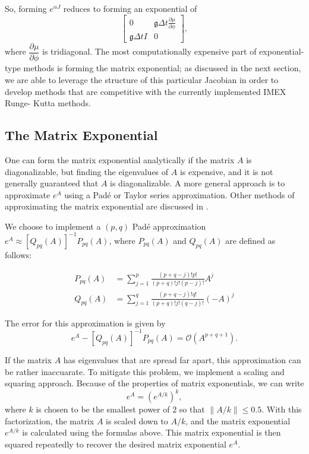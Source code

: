 \documentclass{csri19}
\newcommand{\CFKg}{\mathfrak{g}}
\begin{document}
So, forming $e^{\alpha J}$ reduces to forming an exponential of 
\[ \begin{bmatrix}
   0              & \CFKg \Delta t \frac{\partial \mu}{\partial \phi} \\
 \CFKg \Delta t I & 0  \end{bmatrix},\]
where $\dfrac{\partial \mu}{\partial \phi}$ is tridiagonal. The most 
computationally expensive part of exponential-type methods is forming the 
matrix exponential; as discussed in the next section, we are able to 
leverage the structure of this particular Jacobian in order to develop 
methods that are competitive with the currently implemented IMEX Runge-
Kutta methods.

\subsection{The Matrix Exponential}\label{CFK:sec:matexp} 
One can form the matrix exponential analytically if the matrix $A$ is 
diagonalizable, but finding the eigenvalues of $A$ is expensive, and it is
 not generally guaranteed that $A$ is diagonalizable. A more general 
approach is to approximate $e^{A}$ using a Pad\'e or Taylor series 
approximation. Other methods of approximating the matrix exponential are 
discussed in \cite{CFK:Moler2003}.

We choose to implement a $(p,q)$ Pad\'e approximation 
$e^{A}\approx \left[Q_{pq}(A)\right]^{-1}P_{pq}(A)$, where $P_{pq}(A)$ and 
$Q_{pq}(A)$ are defined as follows:

\begin{align*}
P_{pq}(A) &= \sum_{j=1}^p\frac{(p+q-j)!p!}{(p+q)!j!(p-j)!}A^j\\
Q_{pq}(A) &= \sum_{j=1}^q\frac{(p+q-j)!q!}{(p+q)!j!(q-j)!}(-A)^j
\end{align*}

The error for this approximation is given by
\[ e^A - \left[Q_{pq}(A)\right]^{-1}P_{pq}(A) = \mathcal{O}(A^{p+q+1}).\]

If the matrix $A$ has eigenvalues that are spread far apart, this 
approximation can be rather inaccuarate. To mitigate this problem, we 
implement a scaling and squaring approach. Because of the properties of 
matrix exponentials, we can write
\[e^{A} = \left(e^{A/k}\right)^k,\]
where $k$ is chosen to be the smallest power of $2$ so that 
$\|A/k\| \leq 0.5$. With this factorization, the matrix $A$ is scaled down
 to $A/k$, and the matrix exponential $e^{A/k}$ is calculated using the 
formulas above. This matrix exponential is then squared repeatedly to 
recover the desired matrix exponential $e^{A}$.
\end{document}
